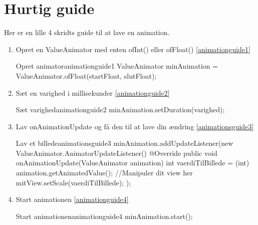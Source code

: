 \section{Hurtig guide}
Her er en lille 4 skridts guide til at lave en animation.
\begin{enumerate}
	\item Opret en ValueAnimator med enten ofInt() eller ofFloat() \autoref{animationguide1}
	\begin{JavaCode}{Opret animator}{animationguide1}
	ValueAnimator minAnimation = ValueAnimator.ofFloat(startFloat, slutFloat);
	\end{JavaCode}
	\item Sæt en varighed i millisekunder \autoref{animationguide2}
	\begin{JavaCode}{Sæt varighed}{animationguide2}
	minAnimation.setDuration(varighed);
	\end{JavaCode}
	\item Lav onAnimationUpdate og få den til at lave din ændring \autoref{animationsguide3}
	\begin{JavaCode}{Lav et billede}{animationsguide3}
		minAnimation.addUpdateListener(new ValueAnimator.AnimatorUpdateListener() {
			@Override
			public void onAnimationUpdate(ValueAnimator animation) {
				int vaerdiTilBillede = (int) animation.getAnimatedValue();
				//Manipuler dit view her
				mitView.setScale(vaerdiTilBillede);
			}
		});
	\end{JavaCode}
	\item Start animationen \autoref{animationguide4}
	\begin{JavaCode}{Start animationen}{animationguide4}
		minAnimation.start();
	\end{JavaCode}
\end{enumerate}

